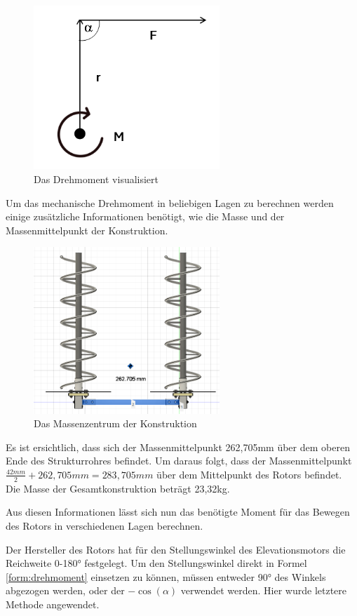 \begin{figure}[h!]
	\centering
	\includegraphics[width=7cm]{../ref/Drehmoment.png}
	\caption{Das Drehmoment visualisiert}
	\label{fig:mechanische-moment}
\end{figure}

Um das mechanische Drehmoment in beliebigen Lagen zu berechnen werden einige zusätzliche Informationen benötigt, wie die Masse und der Massenmittelpunkt der Konstruktion.

\begin{figure}[h!]
	\centering
	\includegraphics[width=7cm]{../ref/Massenmittelpunkt.png}
	\caption{Das Massenzentrum der Konstruktion}
	\label{fig:massenmittelpunkt}
\end{figure}

Es ist ersichtlich, dass sich der Massenmittelpunkt 262,705mm über dem oberen Ende des Strukturrohres befindet. Um daraus folgt, dass der Massenmittelpunkt $\frac{42mm}{2}+262,705mm=283,705mm$ über dem Mittelpunkt des Rotors befindet. Die Masse der Gesamtkonstruktion beträgt 23,32kg.

Aus diesen Informationen lässt sich nun das benötigte Moment für das Bewegen des Rotors in verschiedenen Lagen berechnen.

Der Hersteller des Rotors hat für den Stellungswinkel des Elevationsmotors die Reichweite 0-180° festgelegt. Um den Stellungswinkel direkt in Formel \ref{form:drehmoment} einsetzen zu können, müssen entweder 90° des Winkels abgezogen werden, oder der $-\cos(\alpha)$ verwendet werden. Hier wurde letztere Methode angewendet.


